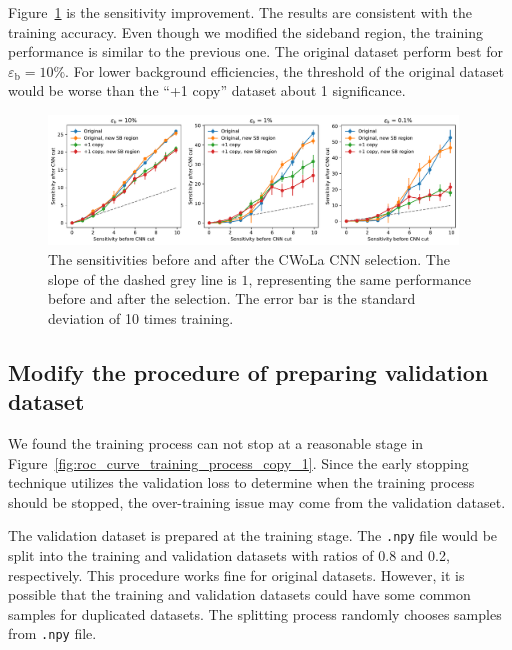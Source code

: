 \documentclass[12pt]{article}
\begin{document}
        Figure~\ref{fig:sensitivity_improvement_new_SB_region} is the sensitivity improvement. The results are consistent with the training accuracy. Even though we modified the sideband region, the training performance is similar to the previous one. The original dataset perform best for $\varepsilon_{\text{b}} = 10 \%$. For lower background efficiencies, the threshold of the original dataset would be worse than the ``+1 copy'' dataset about 1 significance.
        \begin{figure}[htpb]
            \centering
            \includegraphics[width=0.97\textwidth]{HVmodel_sensitivity_improvement_origin_copy_1_new_SB.pdf}
            \caption{The sensitivities before and after the CWoLa CNN selection. The slope of the dashed grey line is $1$, representing the same performance before and after the selection. The error bar is the standard deviation of 10 times training.}
            \label{fig:sensitivity_improvement_new_SB_region}
        \end{figure}
    \subsection{Modify the procedure of preparing validation dataset}%
    \label{sub:modify_the_procedure_of_preparing_validation_dataset}
        We found the training process can not stop at a reasonable stage in Figure~\ref{fig:roc_curve_training_process_copy_1}. Since the early stopping technique utilizes the validation loss to determine when the training process should be stopped, the over-training issue may come from the validation dataset.

        The validation dataset is prepared at the training stage. The \verb|.npy| file would be split into the training and validation datasets with ratios of 0.8 and 0.2, respectively. This procedure works fine for original datasets. However, it is possible that the training and validation datasets could have some common samples for duplicated datasets. The splitting process randomly chooses samples from \verb|.npy| file.
\end{document}
